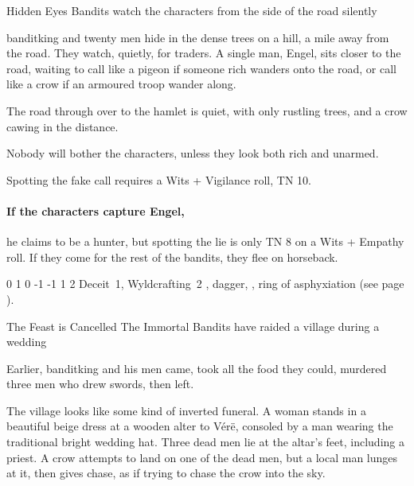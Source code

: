 \begin{multicols}{2}
{Hidden Eyes}%
{Bandits watch the characters from the side of the road silently}%

\gls{banditking} and twenty men hide in the dense trees on a hill, a mile away from the road.
They watch, quietly, for traders.
A single man, Engel, sits closer to the road, waiting to call like a pigeon if someone rich wanders onto the road, or call like a crow if an armoured troop wander along.

\begin{boxtext}

  The road through over to the hamlet is quiet, with only rustling trees, and a crow cawing in the distance.

\end{boxtext}

Nobody will bother the characters, unless they look both rich and unarmed.

Spotting the fake call requires a Wits + Vigilance roll, TN 10.

\paragraph{If the characters capture Engel,}
he claims to be a hunter, but spotting the lie is only TN 8 on a Wits + Empathy roll.
If they come for the rest of the bandits, they flee on horseback.


{0}%
{1}%
{{0}%
{-1}%
{-1}}%
{1}%
{2}%
{Deceit~1, Wyldcrafting~2}%
{\shortsword, dagger, \partialleather, ring of asphyxiation (see page \pageref{ring_asphyxiation}).}%
{}

{The Feast is Cancelled}%
{The Immortal Bandits have raided a village during a wedding}%

Earlier, \gls{banditking} and his men came, took all the food they could, murdered three men who drew swords, then left.

\begin{boxtext}

  The village looks like some kind of inverted funeral.
  A woman stands in a beautiful beige dress at a wooden alter to V\'{e}r\"{e}, consoled by a man wearing the traditional bright wedding hat.
  Three dead men lie at the altar's feet, including a priest.
  A crow attempts to land on one of the dead men, but a local man lunges at it, then gives chase, as if trying to chase the crow into the sky.


\end{boxtext}
\end{multicols}
